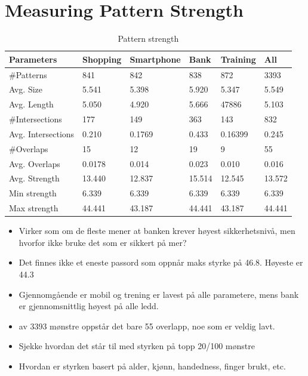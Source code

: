 \section{Measuring Pattern Strength} \label{sec:patternStrength}
  
    \begin{table}[H]
      \begin{tabular}{l || l | l | l | l || l}
        \hline
        {\bf Parameters} & {\bf Shopping} & {\bf Smartphone} & {\bf Bank} & {\bf Training} & {\bf All} \\ \hline
        \#Patterns & 841 & 842 & 838 & 872 & 3393 \\
        Avg. Size & 5.541 & 5.398 & 5.920 & 5.347 & 5.549 \\ 
        Avg. Length & 5.050 & 4.920 & 5.666 & 47886 & 5.103 \\
        \#Intersections & 177 & 149 & 363 & 143 & 832 \\
        Avg. Intersections & 0.210 & 0.1769 & 0.433 & 0.16399 & 0.245 \\
        \#Overlaps & 15 & 12 & 19 & 9 & 55 \\
        Avg. Overlaps & 0.0178 & 0.014 & 0.023 & 0.010 & 0.016\\ \hline
        Avg. Strength & 13.440 & 12.837 & 15.514 & 12.545 & 13.572 \\ 
        Min strength & 6.339 & 6.339 & 6.339 & 6.339 & 6.339 \\
        Max strength & 44.441 & 43.187 & 44.441 & 43.187 & 44.441 \\ \hline
      \end{tabular}
      \caption{Pattern strength}
      \label{tab:patternstrength}
    \end{table}

    {\bf \color{red}{Note-to-self:}}
    \begin{itemize}
      \item Virker som om de fleste mener at banken krever høyest sikkerhetsnivå, men hvorfor ikke bruke det som er sikkert på mer?
      \item Det finnes ikke et eneste passord som oppnår maks styrke på 46.8. Høyeste er 44.3
      \item Gjennomgående er mobil og trening er lavest på alle parametere, mens bank er gjennomsnittlig høyest på alle ledd.
      \item av 3393 mønstre oppstår det bare 55 overlapp, noe som er veldig lavt.
      \item Sjekke hvordan det står til med styrken på topp 20/100 mønstre
      \item Hvordan er styrken basert på alder, kjønn, handedness, finger brukt, etc. 
    \end{itemize}


